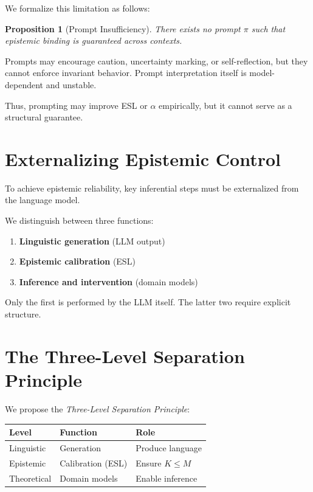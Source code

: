 \documentclass[11pt,a4paper]{article}
\newtheorem{proposition}{Proposition}[section]
\begin{document}
We formalize this limitation as follows:

\begin{proposition}[Prompt Insufficiency]
There exists no prompt $\pi$ such that epistemic binding is guaranteed across contexts.
\end{proposition}

Prompts may encourage caution, uncertainty marking, or self-reflection, but they cannot enforce invariant behavior. Prompt interpretation itself is model-dependent and unstable.

Thus, prompting may improve ESL or $\alpha$ empirically, but it cannot serve as a structural guarantee.


\section{Externalizing Epistemic Control}

To achieve epistemic reliability, key inferential steps must be externalized from the language model.

We distinguish between three functions:
\begin{enumerate}
    \item \textbf{Linguistic generation} (LLM output)
    \item \textbf{Epistemic calibration} (ESL)
    \item \textbf{Inference and intervention} (domain models)
\end{enumerate}

Only the first is performed by the LLM itself. The latter two require explicit structure.


\section{The Three-Level Separation Principle}

We propose the \emph{Three-Level Separation Principle}:

\begin{center}
\begin{tabular}{lll}
\toprule
\textbf{Level} & \textbf{Function} & \textbf{Role} \\
\midrule
Linguistic & Generation & Produce language \\
Epistemic & Calibration (ESL) & Ensure $K \le M$ \\
Theoretical & Domain models & Enable inference \\
\bottomrule
\end{tabular}
\end{center}
\end{document}
